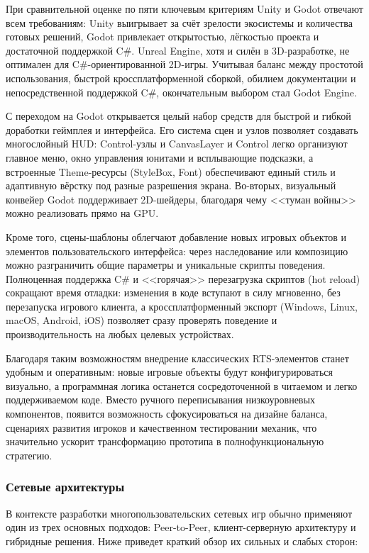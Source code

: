         При сравнительной оценке по пяти ключевым критериям Unity и Godot отвечают всем требованиям: Unity выигрывает за счёт зрелости экосистемы и количества готовых решений, Godot привлекает открытостью, лёгкостью проекта и достаточной поддержкой C\#. Unreal Engine, хотя и силён в 3D-разработке, не оптимален для C\#-ориентированной 2D-игры. Учитывая баланс между простотой использования, быстрой кроссплатформенной сборкой, обилием документации и непосредственной поддержкой C\#, окончательным выбором стал Godot Engine.

        С переходом на Godot открывается целый набор средств для быстрой и гибкой доработки геймплея и интерфейса. Его система сцен и узлов позволяет создавать многослойный HUD: Control-узлы и CanvasLayer и Control легко организуют главное меню, окно управления юнитами и всплывающие подсказки, а встроенные Theme-ресурсы (StyleBox, Font) обеспечивают единый стиль и адаптивную вёрстку под разные разрешения экрана. Во-вторых, визуальный конвейер Godot поддерживает 2D-шейдеры, благодаря чему <<туман войны>> можно реализовать прямо на GPU.

        Кроме того, сцены-шаблоны облегчают добавление новых игровых объектов и элементов пользовательского интерфейса: через наследование или композицию можно разграничить общие параметры и уникальные скрипты поведения. Полноценная поддержка C\# и <<горячая>> перезагрузка скриптов (hot reload) сокращают время отладки: изменения в коде вступают в силу мгновенно, без перезапуска игрового клиента, а кроссплатформенный экспорт (Windows, Linux, macOS, Android, iOS) позволяет сразу проверять поведение и производительность на любых целевых устройствах.

        Благодаря таким возможностям внедрение классических RTS-элементов станет удобным и оперативным: новые игровые объекты будут конфигурироваться визуально, а программная логика останется сосредоточенной в читаемом и легко поддерживаемом коде. Вместо ручного переписывания низкоуровневых компонентов, появится возможность сфокусироваться на дизайне баланса, сценариях развития игроков и качественном тестировании механик, что значительно ускорит трансформацию прототипа в полнофункциональную стратегию.

        \subsubsection{Сетевые архитектуры}

        В контексте разработки многопользовательских сетевых игр обычно применяют один из трех основных подходов: Peer-to-Peer, клиент-серверную архитектуру и гибридные решения. Ниже приведет краткий обзор их сильных и слабых сторон:

